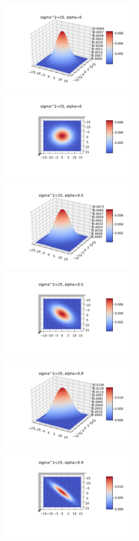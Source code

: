 \documentclass[english]{exercisesheet}
\begin{document}
\begin{solution}
\begin{figure}
 \includegraphics[width=0.5\textwidth]{images/plot-5-0-side.pdf} \includegraphics[width=0.5\textwidth]{images/plot-5-0-top.pdf}\\
 \includegraphics[width=0.5\textwidth]{images/plot-5-5-side.pdf} \includegraphics[width=0.5\textwidth]{images/plot-5-5-top.pdf}\\
 \includegraphics[width=0.5\textwidth]{images/plot-5-9-side.pdf} \includegraphics[width=0.5\textwidth]{images/plot-5-9-top.pdf}

\end{figure}
\end{solution}
\end{document}
